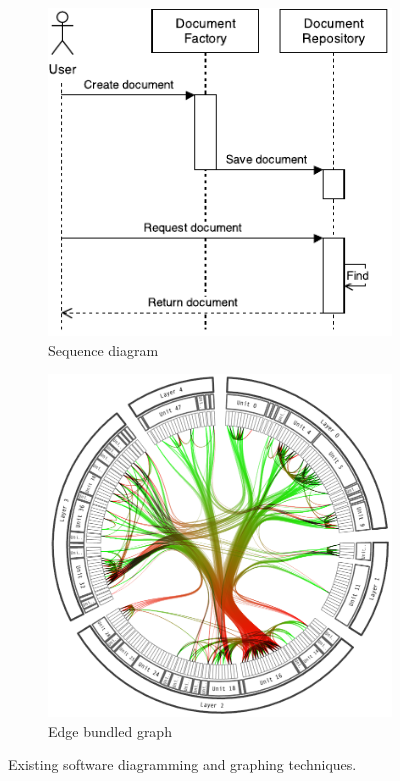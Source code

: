 \begin{figure}
\begin{subfigure}{.5\textwidth}
\centering
  \includegraphics[width=.8\linewidth]{../images/code-visualisations/sequence-diagram.pdf}
  \caption{Sequence diagram}
  \label{fig:sequence-diagram}
\end{subfigure}%
\begin{subfigure}{.5\textwidth}
\centering
  \includegraphics[width=0.8\linewidth]{../images/code-visualisations/bundle-graph.png}
  \caption{Edge bundled graph \protect\cite{Holten2006}}
  \label{fig:bundle-graph}
\end{subfigure}

\caption[Existing software diagramming and graphing techniques]{Existing software diagramming and graphing techniques.}
\label{fig:code-diagrams}
\end{figure}